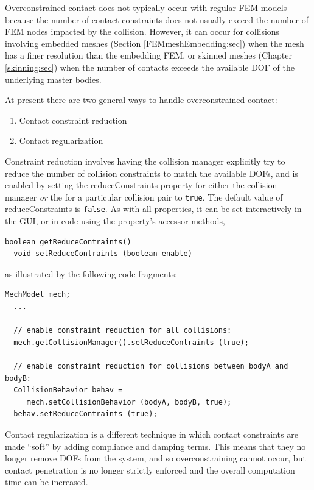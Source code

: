 Overconstrained contact does not typically occur with regular FEM
models because the number of contact constraints does not usually
exceed the number of FEM nodes impacted by the collision.  However, it
can occur for collisions involving embedded meshes (Section
\ref{FEMmeshEmbedding:sec}) when the mesh has a finer resolution than
the embedding FEM, or skinned meshes (Chapter \ref{skinning:sec}) when
the number of contacts exceeds the available DOF of the
underlying master bodies.

At present there are two general ways to handle overconstrained
contact:

\begin{enumerate}

\item Contact constraint reduction

\item Contact regularization

\end{enumerate}

Constraint reduction involves having the collision manager explicitly
try to reduce the number of collision constraints to match the
available DOFs, and is enabled by setting the {\sf reduceConstraints}
property for either the collision manager
{\it or} the 
for a particular collision pair to {\tt true}. The default value of
{\sf reduceConstraints} is {\tt false}. As with all properties, it can
be set interactively in the GUI, or in code using the property's
accessor methods,
%
\begin{lstlisting}[]
  boolean getReduceContraints()
  void setReduceContraints (boolean enable)
\end{lstlisting}
%
as illustrated by the following code fragments:
%
\begin{lstlisting}[]
  MechModel mech;
  ...

  // enable constraint reduction for all collisions:
  mech.getCollisionManager().setReduceContraints (true);

  // enable constraint reduction for collisions between bodyA and bodyB:
  CollisionBehavior behav = 
     mech.setCollisionBehavior (bodyA, bodyB, true);
  behav.setReduceContraints (true);
\end{lstlisting}
%

Contact regularization is a different technique in which contact
constraints are made ``soft'' by adding compliance and damping
terms. This means that they no longer remove DOFs from the system, and
so overconstraining cannot occur, but contact penetration is no longer
strictly enforced and the overall computation time can be increased.


